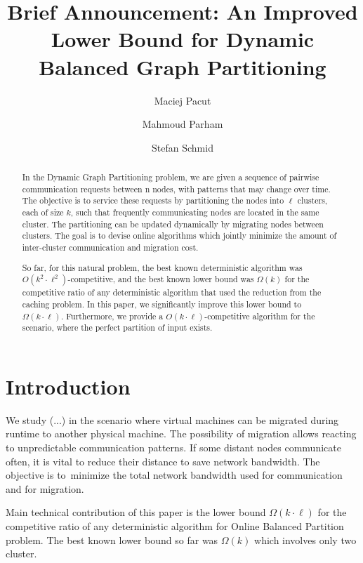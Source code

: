 \documentclass[manuscript,screen=true]{acmart}
\title{Brief Announcement: An Improved Lower Bound for Dynamic Balanced Graph Partitioning}
\author{Maciej Pacut}
\affiliation{%
  \institution{Faculty of Computer Science, University of Vienna}
  \country{Austria}
}
\author{Mahmoud Parham}
\affiliation{%
  \institution{Faculty of Computer Science, University of Vienna}
  \country{Austria}
}
\author{Stefan Schmid}
\affiliation{%
  \institution{Faculty of Computer Science, University of Vienna}
  \country{Austria}
}
\begin{document}
\begin{abstract}
  In the Dynamic Graph Partitioning problem, we are given a sequence of pairwise communication requests between n nodes, with patterns that may change over time.
  The objective is to service these requests by partitioning the nodes into $\ell$ clusters, each of size $k$, such that frequently communicating nodes are located in the same cluster.
  The partitioning can be updated dynamically by migrating nodes between clusters.
  The goal is to devise online algorithms which jointly minimize the amount of inter-cluster communication and migration cost.

  So far, for this natural problem, the best known deterministic algorithm was $O(k^2\cdot \ell^2)$-competitive, and the best known lower bound was $\Omega(k)$ for the competitive ratio of any deterministic algorithm that used the reduction from the caching problem.
  In this paper, we significantly improve this lower bound to $\Omega(k\cdot \ell)$.
  Furthermore, we provide a $O(k\cdot \ell)$-competitive algorithm for the scenario, where the perfect partition of input exists.
\end{abstract}
    
\maketitle
    
\renewcommand{\shortauthors}{M.~Pacut, M.~Parham, S.~Schmid}

\section{Introduction}

We study (...) in the scenario where virtual machines can be migrated during runtime to another physical machine.
The possibility of migration allows reacting to unpredictable communication patterns.
If some distant nodes communicate often, it is vital to reduce their distance to save network bandwidth.
The objective is to~minimize the total network bandwidth used for communication and for migration.

Main technical contribution of this paper is the lower bound $\Omega(k\cdot\ell)$ for the competitive ratio of any deterministic algorithm for Online Balanced Partition problem.
The best known lower bound so far was $\Omega(k)$ \cite{repartition-disc}
which involves only two cluster.
\end{document}
